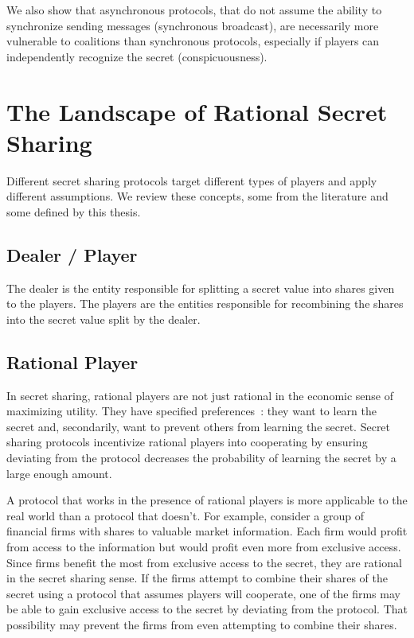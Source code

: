 \documentclass[12pt]{dalcsthesis}
\begin{document}
We also show that asynchronous protocols, that do not assume the ability to synchronize sending messages (synchronous broadcast), are necessarily more vulnerable to coalitions than synchronous protocols, especially if players can independently recognize the secret (conspicuousness).



\section{The Landscape of Rational Secret Sharing}

Different secret sharing protocols target different types of players and apply different assumptions. We review these concepts, some from the literature and some defined by this thesis.

\subsection{Dealer / Player}

The dealer is the entity responsible for splitting a secret value into shares given to the players. The players are the entities responsible for recombining the shares into the secret value split by the dealer.

\subsection{Rational Player}

In secret sharing, rational players are not just rational in the economic sense of maximizing utility. They have specified preferences~\cite{halpern04}: they want to learn the secret and, secondarily, want to prevent others from learning the secret. Secret sharing protocols incentivize rational players into cooperating by ensuring deviating from the protocol decreases the probability of learning the secret by a large enough amount.

A protocol that works in the presence of rational players is more applicable to the real world than a protocol that doesn't. For example, consider a group of financial firms with shares to valuable market information. Each firm would profit from access to the information but would profit even more from exclusive access. Since firms benefit the most from exclusive access to the secret, they are rational in the secret sharing sense. If the firms attempt to combine their shares of the secret using a protocol that assumes players will cooperate, one of the firms may be able to gain exclusive access to the secret by deviating from the protocol. That possibility may prevent the firms from even attempting to combine their shares.
\end{document}
